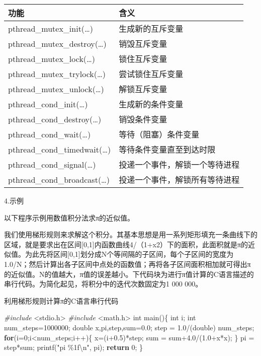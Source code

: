 \documentclass[]{ctexbook}
\newenvironment{Shaded}{\begin{snugshade}}{\end{snugshade}}
\newcommand{\ControlFlowTok}[1]{\textcolor[rgb]{0.13,0.29,0.53}{\textbf{#1}}}
\newcommand{\DataTypeTok}[1]{\textcolor[rgb]{0.13,0.29,0.53}{#1}}
\newcommand{\DecValTok}[1]{\textcolor[rgb]{0.00,0.00,0.81}{#1}}
\newcommand{\FloatTok}[1]{\textcolor[rgb]{0.00,0.00,0.81}{#1}}
\newcommand{\ImportTok}[1]{#1}
\newcommand{\NormalTok}[1]{#1}
\newcommand{\PreprocessorTok}[1]{\textcolor[rgb]{0.56,0.35,0.01}{\textit{#1}}}
\newcommand{\SpecialCharTok}[1]{\textcolor[rgb]{0.00,0.00,0.00}{#1}}
\newcommand{\StringTok}[1]{\textcolor[rgb]{0.31,0.60,0.02}{#1}}
\begin{document}
\begin{longtable}[]{@{}ll@{}}
\toprule
功能 & 含义\tabularnewline
\midrule
\endhead
pthread\_mutex\_init(\ldots) & 生成新的互斥变量\tabularnewline
pthread\_mutex\_destroy(\ldots) & 销毁互斥变量\tabularnewline
pthread\_mutex\_lock(\ldots) & 锁住互斥变量\tabularnewline
pthread\_mutex\_trylock(\ldots) & 尝试锁住互斥变量\tabularnewline
pthread\_mutex\_unlock(\ldots) & 解锁互斥变量\tabularnewline
pthread\_cond\_init(\ldots) & 生成新的条件变量\tabularnewline
pthread\_cond\_destroy(\ldots) & 销毁条件变量\tabularnewline
pthread\_cond\_wait(\ldots) & 等待（阻塞）条件变量\tabularnewline
pthread\_cond\_timedwait(\ldots) & 等待条件变量直至到达时限\tabularnewline
pthread\_cond\_signal(\ldots) & 投递一个事件，解锁一个等待进程\tabularnewline
pthread\_cond\_broadcast(\ldots) & 投递一个事件，解锁所有等待进程\tabularnewline
\bottomrule
\end{longtable}

4.示例

以下程序示例用数值积分法求π的近似值。

我们使用梯形规则来求解这个积分。其基本思想是用一系列矩形填充一条曲线下的区域，就是要求出在区间{[}0,1{]}内函数曲线4/（1+x2）下的面积，此面积就是π的近似值。为此先将区间{[}0,1{]}划分成N个等间隔的子区间，每个子区间的宽度为1.0/N；然后计算出各子区间中点处的函数值；再将各子区间面积相加就可得出π的近似值。N的值越大，π值的误差越小。下代码块为进行π值计算的C语言描述的串行代码。为简化起见，将积分中的迭代次数固定为1 000 000。

利用梯形规则计算π的C语言串行代码

\begin{Shaded}
\begin{Highlighting}[]
\PreprocessorTok{\#include }\ImportTok{\textless{}stdio.h\textgreater{}}
\PreprocessorTok{\#include }\ImportTok{\textless{}math.h\textgreater{}}
\DataTypeTok{int}\NormalTok{ main()\{}
    \DataTypeTok{int}\NormalTok{ i;}
    \DataTypeTok{int}\NormalTok{ num\_steps=}\DecValTok{1000000}\NormalTok{;}
    \DataTypeTok{double}\NormalTok{ x,pi,step,sum=}\FloatTok{0.0}\NormalTok{;}
\NormalTok{    step = }\FloatTok{1.0}\NormalTok{/(}\DataTypeTok{double}\NormalTok{) num\_steps;}
    \ControlFlowTok{for}\NormalTok{(i=}\DecValTok{0}\NormalTok{;i\textless{}num\_steps;i++)\{  }
\NormalTok{        x=(i+}\FloatTok{0.5}\NormalTok{)*step;}
\NormalTok{        sum = sum+}\FloatTok{4.0}\NormalTok{/(}\FloatTok{1.0}\NormalTok{+x*x);}
\NormalTok{    \}}
\NormalTok{    pi = step*sum;}
\NormalTok{    printf(}\StringTok{"pi \%1f}\SpecialCharTok{\textbackslash{}n}\StringTok{"}\NormalTok{, pi);}
    \ControlFlowTok{return} \DecValTok{0}\NormalTok{;}
\NormalTok{\}}
\end{Highlighting}
\end{Shaded}
\end{document}
